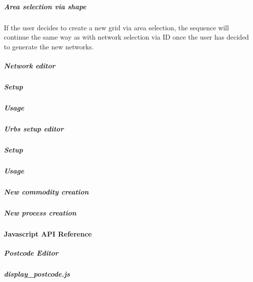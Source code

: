 \documentclass[letterpaper,10pt,english]{sphinxmanual}
\begin{document}
\subparagraph{Area selection via shape}
\label{\detokenize{docs_gui/dev/development:area-selection-via-shape}}
\noindent{}

\sphinxAtStartPar
If the user decides to create a new grid via area selection, the sequence will continue the same way as with network selection via ID once the user
has decided to generate the new networks.


\subparagraph{Network editor}
\label{\detokenize{docs_gui/dev/development:network-editor}}

\subparagraph{Setup}
\label{\detokenize{docs_gui/dev/development:setup}}
\noindent{}


\subparagraph{Usage}
\label{\detokenize{docs_gui/dev/development:usage}}
\noindent{}


\subparagraph{Urbs setup editor}
\label{\detokenize{docs_gui/dev/development:urbs-setup-editor}}

\subparagraph{Setup}
\label{\detokenize{docs_gui/dev/development:id1}}
\noindent{}


\subparagraph{Usage}
\label{\detokenize{docs_gui/dev/development:id2}}

\subparagraph{New commodity creation}
\label{\detokenize{docs_gui/dev/development:new-commodity-creation}}
\noindent{}


\subparagraph{New process creation}
\label{\detokenize{docs_gui/dev/development:new-process-creation}}
\noindent{}

\sphinxstepscope


\paragraph{Javascript API Reference}
\label{\detokenize{docs_gui/js_api/index:javascript-api-reference}}\label{\detokenize{docs_gui/js_api/index::doc}}
\sphinxstepscope


\subparagraph{Postcode Editor}
\label{\detokenize{docs_gui/js_api/postcode_editor/index:postcode-editor}}\label{\detokenize{docs_gui/js_api/postcode_editor/index::doc}}
\sphinxstepscope


\subparagraph{display\_postcode.js}
\label{\detokenize{docs_gui/js_api/postcode_editor/display_postcode:display-postcode-js}}\label{\detokenize{docs_gui/js_api/postcode_editor/display_postcode::doc}}
\end{document}
